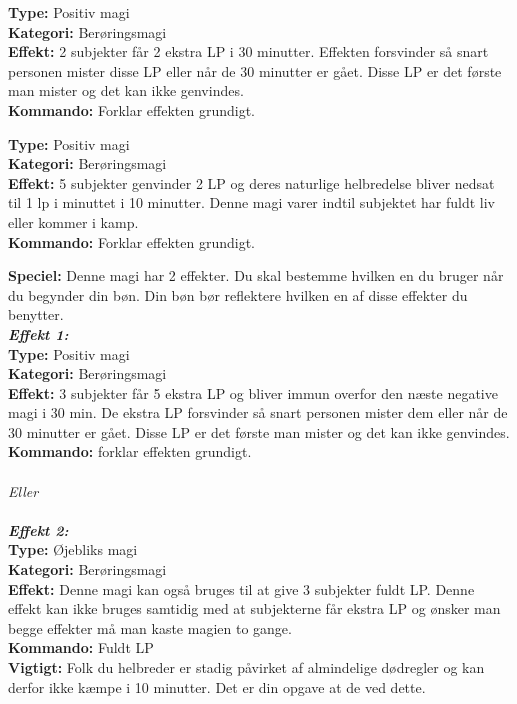 \begin{nvit*}
\textbf{Type:} Positiv magi\\ 
\textbf{Kategori:} Berøringsmagi\\
\textbf{Effekt:} 2 subjekter får 2 ekstra LP i 30 minutter. Effekten forsvinder så snart personen mister disse LP eller når de 30 minutter er gået. Disse LP er det første man mister og det kan ikke genvindes.\\
\textbf{Kommando:} Forklar effekten grundigt.
\end{nvit*}

\begin{nvit*}
\textbf{Type:} Positiv magi \\
\textbf{Kategori:} Berøringsmagi\\
\textbf{Effekt:} 5 subjekter genvinder 2 LP og deres naturlige helbredelse bliver nedsat til 1 lp i minuttet i 10 minutter. Denne magi varer indtil subjektet har fuldt liv eller kommer i kamp.\\
\textbf{Kommando:} Forklar effekten grundigt.
\end{nvit*}

\begin{nvit*}
\textbf{Speciel:} Denne magi har 2 effekter. Du skal bestemme hvilken en du bruger når du begynder din bøn. Din bøn bør reflektere hvilken en af disse effekter du benytter.\\
\emph{\textit{\textbf{Effekt 1:}}} \\
\textbf{Type:} Positiv magi \\
\textbf{Kategori:} Berøringsmagi\\
\textbf{Effekt:} 3 subjekter får 5 ekstra LP og bliver immun overfor den næste negative magi i 30 min. De ekstra LP forsvinder så snart personen mister dem eller når de 30 minutter er gået. Disse LP er det første man mister og det kan ikke genvindes.\\
\textbf{Kommando:} forklar effekten grundigt.\\
\\
\emph{\textit{Eller}}\\
\\
\emph{\textit{\textbf{Effekt 2:}}}\\
\textbf{Type:} Øjebliks magi \\
\textbf{Kategori:} Berøringsmagi \\
\textbf{Effekt:} Denne magi kan også bruges til at give 3 subjekter fuldt LP. Denne effekt kan ikke bruges samtidig
med at subjekterne får ekstra LP og ønsker man begge effekter må man kaste magien to gange.\\
\textbf{Kommando:} Fuldt LP\\
\textbf{Vigtigt:} Folk du helbreder er stadig påvirket af almindelige dødregler og kan derfor ikke kæmpe i 10 minutter. Det er din opgave at de ved dette.\\
\end{nvit*}

